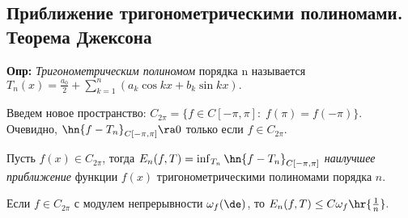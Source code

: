 \documentclass{article}
\begin{document}
\subsection{Приближение тригонометрическими полиномами. Теорема Джексона}
\textbf{Опр:} \emph{Тригонометрическим полиномом} порядка n
называется $T_n(x)=\frac{a_0}2+\sum_{k=1}^n (a_k\cos kx+b_k\sin
kx).$

\medskip Введем новое пространство: $C_{2\pi}=\{f\in
C[-\pi,\pi]:\;f(\pi)=f(-\pi)\}.$ Очевидно,
$\hn{f-T_n}_{C[-\pi,\pi]}\ra 0$ только если $f\in
C_{2\pi}.$

\begin{df}
  Пусть $f(x)\in C_{2\pi}$, тогда
  $E_n(f,T)=\inf_{T_n}\hn{f-T_n}_{C[-\pi,\pi]}$ \emph{наилучшее
    приближение} функции $f(x)$ тригонометрическими полиномами порядка
  $n.$
\end{df}

\begin{theorem}[Джексона] Если $f\in C_{2\pi}$ с модулем непрерывности $\omega_f(\de)$, то $E_n(f,T)\le
C\omega_f\hr{\frac1n}.$
\end{theorem}
\end{document}
